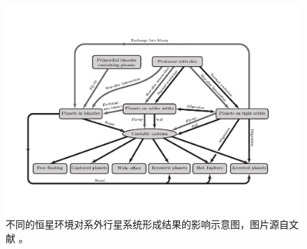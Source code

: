 \begin{figure}[t!]
\centering
\includegraphics[width=1.0\textwidth]{figures/chapter1/fig16_planetenv.pdf}
\caption[不同的恒星环境对系外行星系统形成结果的影响示意图，图片版权 Malmberg 2011。]{不同的恒星环境对系外行星系统形成结果的影响示意图，图片源自文献 。}
\label{fig:pfenv}
\end{figure}










